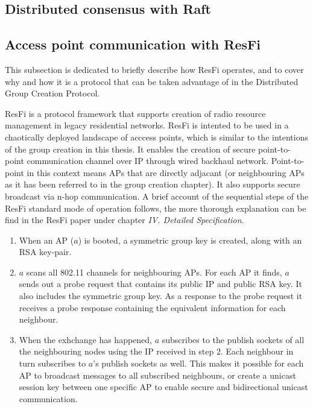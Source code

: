 \subsection{Distributed consensus with Raft}
\subsection{Access point communication with ResFi}
This subsection is dedicated to briefly describe how ResFi operates, and to cover why and how it is a protocol that can be taken advantage of in the Distributed Group Creation Protocol. 

ResFi is a protocol framework that supports creation of radio resource management in legacy residential networks. ResFi is intented to be used in  a chaotically deployed landscape of acccess points,
which is similar to the intentions of the group creation in this thesis. It enables the creation of secure point-to-point communication channel over IP through wired backhaul network. 
Point-to-point in this context means APs that are directly adjacant (or neighbouring APs as it has been referred to in the group creation chapter).
It also supports secure broadcast via n-hop communication. A brief account of the sequential steps of the ResFi standard mode of operation follows,
the more thorough explanation can be find in the ResFi paper \cite{resfi} under chapter \textit{IV. Detailed Specification}.

\begin{enumerate}
	\item When an AP ($a$) is booted, a symmetric group key is created, along with an RSA key-pair. 
	\item $a$ scans all 802.11 channels for neighbouring APs. For each AP it finds, $a$ sends out a probe request that contains its public IP and public RSA key. It also includes
		the symmetric group key. As a response to the probe request it receives a probe response containing the equivalent information for each neighbour. 
	\item When the exhchange has happened, $a$ subscribes to the publish sockets of all the neighbouring nodes using the IP received in step 2. Each neighbour in turn subscribes to $a$'s
		publish sockets as well. This makes it possible for each AP to broadcast messages to all subscribed neighbours,
		or create a unicast session key between one specific AP to enable secure and bidirectional unicast communication.
\end{enumerate}

